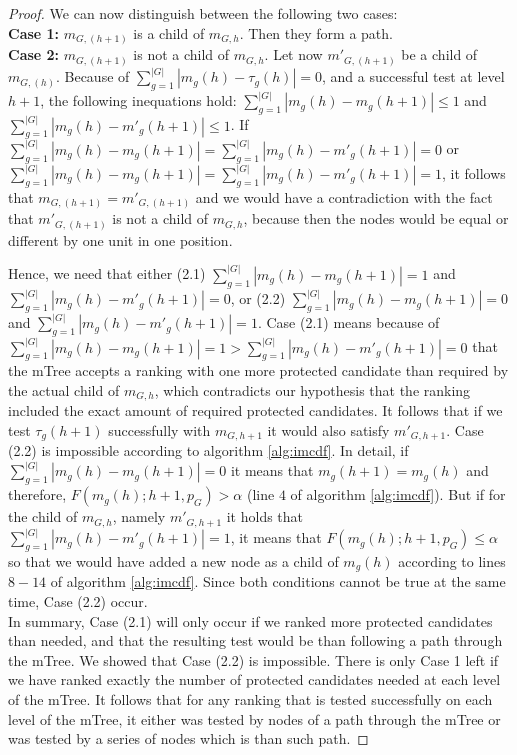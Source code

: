 \begin{proof}
	\noindent We can now distinguish between the following two cases:
	\\
	\textbf{Case 1:} $m_{G,(h+1)}$ is a child of $m_{G,h}$.
	Then they form a path. %
	\\
	\textbf{Case 2:} $m_{G,(h+1)}$ is not a child of $m_{G,h}$.
	Let now ${m'}_{G,(h+1)}$ be a child of $m_{G,(h)}$.
	Because of $\sum_{g=1}^{|G|} |m_{g}(h) - \tau_{g}(h)| = 0$, and a successful test at level $h+1$, the following inequations hold: $\sum_{g=1}^{|G|} |m_{g}(h) - m_g(h+1)| \leq 1$ and $\sum_{g=1}^{|G|} |m_{g}(h) - m'_g(h+1)| \leq 1$.
	If $\sum_{g=1}^{|G|} |m_{g}(h) - m_g(h+1)| = \sum_{g=1}^{|G|} |m_{g}(h) - m'_g(h+1)| = 0$ or $\sum_{g=1}^{|G|} |m_{g}(h) - m_g(h+1)| = \sum_{g=1}^{|G|} |m_{g}(h) - m'_g(h+1)| = 1$, it follows that $m_{G,(h+1)} = {m'}_{G,(h+1)}$ and we would have a contradiction with the fact that ${m'}_{G,(h+1)}$ is not a child of $m_{G,h}$, because then the nodes would be equal or different by one unit in one position.

	Hence, we need that either
	(2.1) $\sum_{g=1}^{|G|} |m_{g}(h) - m_g(h+1)| = 1$ and $\sum_{g=1}^{|G|} |m_{g}(h) - m'_g(h+1)| = 0$,
	or
	(2.2) $\sum_{g=1}^{|G|} |m_{g}(h) - m_g(h+1)| = 0$ and $\sum_{g=1}^{|G|} |m_{g}(h) - m'_g(h+1)| = 1$.
	Case (2.1) means because of $\sum_{g=1}^{|G|} |m_{g}(h) - m_g(h+1)| = 1 > \sum_{g=1}^{|G|} |m_{g}(h) - m'_g(h+1)| = 0$ that the mTree accepts a ranking with one more protected candidate than required by the actual child of $m_{G,h}$, which contradicts our hypothesis that the ranking included the exact amount of required protected candidates. It follows that if we test $\tau_g (h+1)$ successfully with $m_{G,h+1}$ it would also satisfy ${m'}_{G,h+1}$.
Case (2.2) is impossible according to algorithm \ref{alg:imcdf}.
In detail, if $\sum_{g=1}^{|G|} |m_{g}(h) - m_g(h+1)| = 0$ it means that $ m_g(h+1) = m_{g}(h)$ and therefore, $F(m_{g}(h);h+1,p_G) > \alpha$ (line $4$ of algorithm \ref{alg:imcdf}). But if for the child of $m_{G,h}$, namely ${m'}_{G,h+1}$ it holds that $\sum_{g=1}^{|G|} |m_{g}(h) - m'_g(h+1)| = 1$, it means that
$F(m_{g}(h);h+1,p_G) \leq \alpha$ so that we would have added a new node as a child of $m_{g}(h)$ according to lines  $8-14$ of algorithm \ref{alg:imcdf}. Since both conditions cannot be true at the same time, Case (2.2)  occur.
\\
In summary, Case (2.1) will only occur if we ranked more protected candidates than needed, and that the resulting test would be  than following a path through the mTree.
%
We showed that Case (2.2) is impossible. There is only Case 1 left if we have ranked exactly the number of protected candidates needed at each level of the mTree.
%
It follows that for any ranking that is tested successfully on each level of the mTree, it either was tested by nodes of a path through the mTree or was tested by a series of nodes which is  than such path.
\end{proof}
